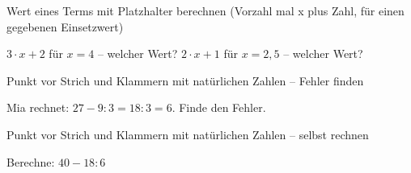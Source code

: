 \begin{aufgabe}{Wert eines Terms mit Platzhalter berechnen (Vorzahl mal x plus Zahl, für einen gegebenen Einsetzwert)}
\begin{teile}
\teil $3 \cdot x + 2$ für $x = 4$ – welcher Wert? \leerfeld
\teil $2 \cdot x + 1$ für $x = 2{,}5$ – welcher Wert? \leerfeld
\end{teile}
\end{aufgabe}

\begin{aufgabe}{Punkt vor Strich und Klammern mit natürlichen Zahlen – Fehler finden}
\begin{teile}
\teil Mia rechnet: $27 - 9 : 3 = 18 : 3 = 6$. Finde den Fehler.
\end{teile}
\end{aufgabe}

\begin{aufgabe}{Punkt vor Strich und Klammern mit natürlichen Zahlen – selbst rechnen}
\begin{teile}
\teil Berechne: $40 - 18 : 6$ \leerfeld
\end{teile}
\end{aufgabe}
